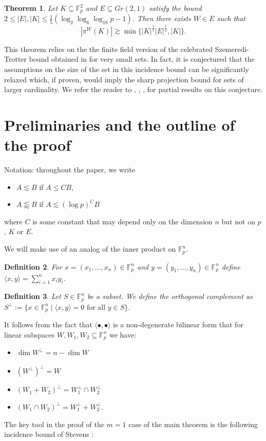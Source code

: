 \documentclass{amsart}
\newtheorem{theorem}{Theorem}[section]
\newtheorem{definition}[theorem]{Definition}
\newcommand{\F}{\mathbb F}
\begin{document}
\begin{theorem}\label{smallSetProjections}
    Let $K \subseteq \F_p^2$ and $E \subseteq Gr(2, 1)$ satisfy the bound $2 \leq |E|, |K| \leq \frac{1}{5} (\log_2 \log_6 \log_{18} p - 1)$. Then there exists $W \in E$ such that $$|\pi^W(K)| \gtrsim \min\{|K|^\frac{1}{2}|E|^\frac{1}{2}, |K| \}.$$
\end{theorem}
This theorem relies on the the finite field version of the celebrated Szemeredi-Trotter bound \cite{Sze83} obtained in \cite{Gro13} for very small sets. In fact, it is conjectured that the assumptions on the size of the set in this incidence bound can be significantly relaxed which, if proven, would imply the sharp projection bound for sets of larger cardinality. We refer the reader to \cite{Bou04}, \cite{Jon11}, \cite{Ste16}, \cite{Vin11} for partial results on this conjecture.

\section{Preliminaries and the outline of the proof}
Notation: throughout the paper, we write 
\begin{itemize}
    \item $A \lesssim B$ if $A \leq CB$,
    \item $A \lessapprox B$ if $A \lesssim (\log p)^{C} B$
\end{itemize}
where $C$ is some constant that may depend only on the dimension $n$ but not on $p$, $K$ or $E$.

We will make use of an analog of the inner product on $\F_p^n$.
\begin{definition}
For $x = (x_1, \ldots, x_n) \in \F_p^n$ and $y = (y_1, \ldots, y_n) \in \F_p^n$ define $\langle x, y \rangle = \sum_{i = 1}^n x_i y_i$.
\end{definition}
\begin{definition}
Let $S \in \F_p^n$ be a subset. We define the orthogonal complement as $S^\bot := \{x \in \F_p^n \mid \langle x, y \rangle = 0 \text{ for all } y \in S\}$.
\end{definition}
It follows from the fact that $\langle \bullet, \bullet \rangle$ is a non-degenerate bilinear form that for linear subspaces $W, W_1, W_2 \subseteq \F_p^n$ we have:
\begin{itemize}
    \item $\dim W^\bot = n - \dim W$
    \item $(W^\bot)^\bot = W$
    \item $(W_1 + W_2)^\bot = W_1^\bot \cap W_2^\bot$
    \item $(W_1 \cap W_2)^\bot = W_1^\bot + W_2^\bot$.
\end{itemize} 
The key tool in the proof of the $m = 1$ case of the main theorem is the following incidence bound of Stevens \cite{Ste16}:
\end{document}
